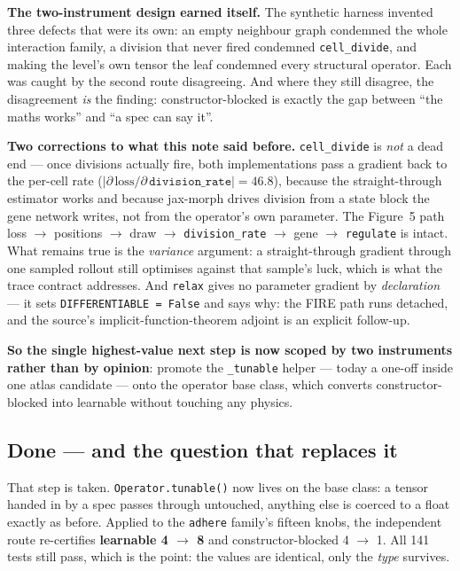 \documentclass[11pt,a4paper]{article}
\newcommand{\code}[1]{\texttt{#1}}
\begin{document}
\textbf{The two-instrument design earned itself.} The synthetic harness invented three defects
that were its own: an empty neighbour graph condemned the whole interaction family, a division
that never fired condemned \code{cell\_divide}, and making the level's own tensor the leaf
condemned every structural operator. Each was caught by the second route disagreeing. And where
they still disagree, the disagreement \emph{is} the finding: constructor-blocked is exactly the
gap between ``the maths works'' and ``a spec can say it''.

\textbf{Two corrections to what this note said before.} \code{cell\_divide} is \emph{not} a dead
end --- once divisions actually fire, both implementations pass a gradient back to the per-cell
rate ($|\partial\,\mathrm{loss}/\partial\,\code{division\_rate}| = 46.8$), because the
straight-through estimator works and because jax-morph drives division from a state block the
gene network writes, not from the operator's own parameter. The Figure~5 path
loss $\to$ positions $\to$ draw $\to$ \code{division\_rate} $\to$ gene $\to$ \code{regulate} is
intact. What remains true is the \emph{variance} argument: a straight-through gradient through one
sampled rollout still optimises against that sample's luck, which is what the trace contract
addresses. And \code{relax} gives no parameter gradient by \emph{declaration} --- it sets
\code{DIFFERENTIABLE = False} and says why: the FIRE path runs detached, and the source's
implicit-function-theorem adjoint is an explicit follow-up.

\textbf{So the single highest-value next step is now scoped by two instruments rather than by
opinion}: promote the \code{\_tunable} helper --- today a one-off inside one atlas candidate ---
onto the operator base class, which converts constructor-blocked into learnable without touching
any physics.

\subsection{Done --- and the question that replaces it}\label{sec:p6tunable}

That step is taken. \code{Operator.tunable()} now lives on the base class: a tensor handed in by a
spec passes through untouched, anything else is coerced to a float exactly as before. Applied to
the \code{adhere} family's fifteen knobs, the independent route re-certifies
\textbf{learnable 4 $\to$ 8} and constructor-blocked 4 $\to$ 1. All 141 tests still pass, which is
the point: the values are identical, only the \emph{type} survives.
\end{document}
